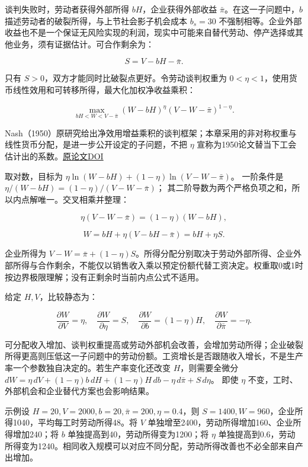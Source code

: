 \documentclass[UTF8,fontset=windows,12pt,a4paper,oneside,openany]{ctexbook}
\begin{document}
谈判失败时，劳动者获得外部所得 \(bH\)，企业获得外部收益 \(\bar\pi\)。在这一子问题中，\(b\) 描述劳动者的破裂所得，与上节社会影子机会成本 \(b_s=30\) 不强制相等。企业外部收益也不是一个保证无风险实现的利润，现实中可能来自替代劳动、停产选择或其他业务，须有证据估计。可合作剩余为：

\[
S=V-bH-\bar\pi.
\tag{14-17}
\]

只有 \(S>0\)，双方才能同时比破裂点更好。令劳动谈判权重为 \(0<\eta<1\)，使用货币线性效用和可转移所得，最大化加权净收益乘积：

\[
\max_{bH<W<V-\bar\pi}
(W-bH)^\eta(V-W-\bar\pi)^{1-\eta}.
\tag{14-18}
\]

Nash（1950）原研究给出净效用增益乘积的谈判框架；本章采用的非对称权重与线性货币分配，是进一步公开设定的子问题，不把 \(\eta\) 宣称为1950论文替当下工会估计出的系数。\href{https://doi.org/10.2307/1907266}{原论文DOI}

取对数，目标为
\(\eta\ln(W-bH)+(1-\eta)\ln(V-W-\bar\pi)\)。
一阶条件是
\(\eta/(W-bH)=(1-\eta)/(V-W-\bar\pi)\)；
其二阶导数为两个严格负项之和，所以内点解唯一。交叉相乘并整理：

\[
\eta(V-W-\bar\pi)=(1-\eta)(W-bH),
\]

\[
W=bH+\eta(V-bH-\bar\pi)=bH+\eta S.
\tag{14-19}
\]

企业所得为 \(V-W=\bar\pi+(1-\eta)S\)。所得分配分别取决于劳动外部所得、企业外部所得与合作剩余，不能仅以销售收入乘以预定份额代替工资决定。权重取0或1时按边界极限理解；没有正剩余时当前内点公式不适用。

给定 \(H,V\)，比较静态为：

\[
\frac{\partial W}{\partial V}=\eta,\quad
\frac{\partial W}{\partial \eta}=S,\quad
\frac{\partial W}{\partial b}=(1-\eta)H,\quad
\frac{\partial W}{\partial\bar\pi}=-\eta.
\tag{14-20}
\]

可分配收入增加、谈判权重提高或劳动外部机会改善，会增加劳动所得；企业破裂所得更高则压低这一子问题中的劳动份额。工资增长是否跟随收入增长，不是生产率一个参数独自决定的。若生产率变化还改变 \(H\)，则需要全微分
\(dW=\eta\,dV+(1-\eta)b\,dH+(1-\eta)H\,db-\eta\,d\bar\pi+S\,d\eta\)。
即使 \(\eta\) 不变，工时、外部机会和企业替代方案也会影响结果。

示例设 \(H=20,V=2000,b=20,\bar\pi=200,\eta=0.4\)，则 \(S=1400,W=960\)，企业所得1040，平均每工时劳动所得48。将 \(V\) 单独增至2400，劳动所得增加160、企业所得增加240；将 \(b\) 单独提高到40，劳动所得变为1200；将 \(\eta\) 单独提高到0.6，劳动所得变为1240。相同收入规模可以对应不同分配，劳动所得改善也不必全部来自产出增加。
\end{document}
